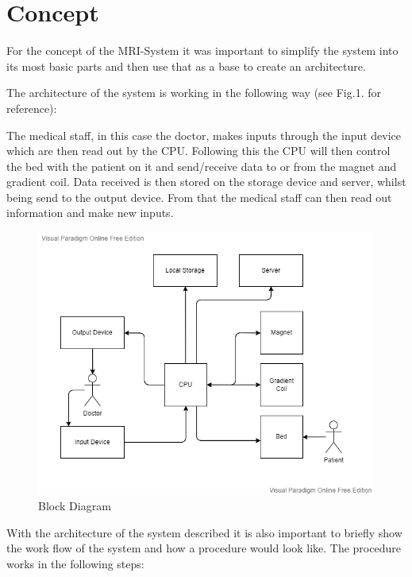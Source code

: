 \documentclass[conference]{IEEEtran}
\begin{document}
\section{Concept}

    For the concept of the MRI-System it was important to simplify the system into its most basic parts and then use that as a base to create an architecture.

    The architecture of the system is working in the following way (see Fig.1. for reference):

    The medical staff, in this case the doctor, makes inputs through the input device which are then read out by the CPU. Following this the CPU will then control the bed with the patient on it and send/receive data to or from the magnet and gradient coil. Data received is then stored on the storage device and server, whilst being send to the output device. From that the medical staff can then read out information and make new inputs.

    \begin{figure}[htbp]
    \centerline{\includegraphics[scale = 0.4]{Pictures/blockdiag.png}}
    \caption{Block Diagram}
    \label{block}
    \end{figure}

    With the architecture of the system described it is also important to briefly show the work flow of the system and how a procedure would look like. The procedure works in the following steps:
    
\end{document}
